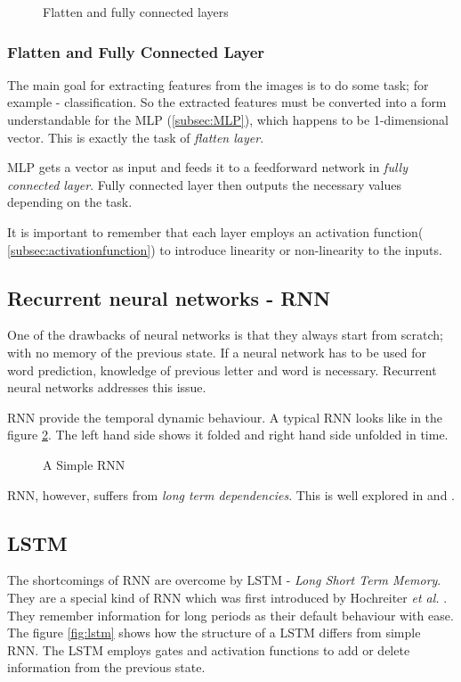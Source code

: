 \begin{figure}[h]
    \centering
    \def\svgwidth{\textwidth}
    
    \caption{Flatten and fully connected layers}
    \label{fig:flattenfc}
\end{figure}
\subsubsection*{Flatten and Fully Connected Layer}
The main goal for extracting features from the images is to do some task; for example -
classification. So the extracted features must be converted into a form understandable for
the MLP (\ref{subsec:MLP}), which happens to be 1-dimensional vector. This is exactly the
task of \textit{flatten layer}.

MLP gets a vector as input and feeds it to a feedforward network in \textit{fully
connected layer}. Fully connected layer then outputs the necessary values depending on the
task.

It is important to remember that each layer employs an activation function(
\ref{subsec:activationfunction}) to introduce linearity or non-linearity to the inputs.

\subsection{Recurrent neural networks - RNN}
One of the drawbacks of neural networks is that they always start from scratch; with no
memory of the previous state. If a neural network has to be used for word prediction,
knowledge of previous letter and word is necessary. Recurrent neural networks addresses
this issue.

RNN provide the temporal dynamic behaviour. A typical RNN looks like in the figure
\ref{fig:RNN}. The left hand side shows it folded and right hand side unfolded in time.
\begin{figure}[h]
        \def\svgwidth{1.1\textwidth}
        
    \caption{A Simple RNN}
    \label{fig:RNN}
\end{figure}
RNN, however, suffers from \textit{long term dependencies}. This is well explored in
\cite{RNNdrawback1} and \cite{RNNdrawback2}.

\subsection{LSTM}
\label{subsubsec:lstm}
The shortcomings of RNN are overcome by LSTM - \textit{Long Short Term Memory}.
They are a special kind of RNN which was first introduced by Hochreiter \textit{et al.} \cite{LSTMPaper}. They remember
information for long periods as their default behaviour with ease. The figure
\ref{fig:lstm} shows how the structure of a LSTM differs from simple RNN. The LSTM employs
gates and activation functions to add or delete information from the previous state.

